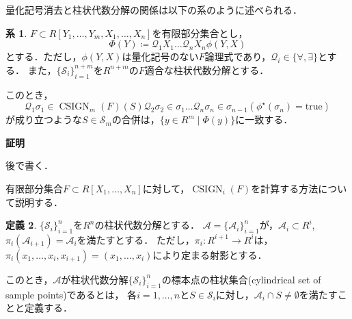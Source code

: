 \documentclass[uplatex, dvipdfmx]{jsarticle}
\makeatletter
\numberwithin{equation}{section}
\renewenvironment{proof}[1][\proofname]{\par
  \pushQED{\qed}%
  \normalfont \topsep6\p@\@plus6\p@\relax
  \trivlist
  \item\relax
  {\bfseries
  #1\@addpunct{.}}\hspace\labelsep\ignorespaces
}{
  \popQED\endtrivlist\@endpefalse
}
\newcommand{\Qua}{\mathcal{Q}}
\newcommand{\calS}{\mathcal{S}}
\newcommand{\map}[3]{{#1}\colon{#2}\rightarrow{#3}}
\newcommand{\true}{\text{true}}
\DeclareMathOperator{\CSIGN}{CSIGN}
\theoremstyle{definition}
\newtheorem{definition}{定義}[section]
\newtheorem{corollary}[definition]{系}
\renewcommand{\proofname}{\textbf{証明}}
\makeatother
\begin{document}
量化記号消去と柱状代数分解の関係は以下の系のように述べられる．
\begin{corollary}
     $F \subset R[Y_1, \dots, Y_m, X_1, \dots, X_n]$を有限部分集合とし，
     \begin{equation}
          \Phi(Y)\coloneqq \Qua_1 X_1 \dots \Qua_n X_n \phi(Y,X)
     \end{equation}
     とする．ただし，$\phi(Y,X)$は量化記号のない$F$論理式であり，$\Qua_i \in \{\forall, \exists\}$とする．
     また，$\{\calS_i\}_{i=1}^{n+m}$を$R^{n+m}$の$F$適合な柱状代数分解とする．

     このとき，
     \begin{equation}
          \Qua_1 \sigma_1 \in \CSIGN_m(F)(S) \Qua_2 \sigma_2 \in \sigma_1 \dots \Qua_n \sigma_n \in \sigma_{n-1}(\phi^\star(\sigma_n) = \true)
     \end{equation}
     が成り立つような$S \in \calS_m$の合併は，$\{y \in R^m \mid \Phi(y)\}$に一致する．
\end{corollary}

\begin{proof}
     後で書く．
\end{proof}


有限部分集合$F \subset R[X_1, \dots, X_n]$に対して，$\CSIGN_i(F)$を計算する方法について説明する．

\begin{definition}
     $\{\calS_i\}_{i=1}^n$を$R^n$の柱状代数分解とする．
     $\mathcal{A}=\{\mathcal{A}_{i}\}_{i=1}^n$が，$\mathcal{A}_i \subset R^i$, $\pi_i(\mathcal{A}_{i+1}) = \mathcal{A}_i$を満たすとする．
     ただし，$\map{\pi_i}{R^{i+1}}{R^i}$は，$\pi_i(x_1, \dots, x_i, x_{i+1}) = (x_1, \dots, x_i)$により定まる射影とする．
     
     このとき，$\mathcal{A}$が柱状代数分解$\{\calS_i\}_{i=1}^n$の標本点の柱状集合(cylindrical set of sample points)であるとは，
     各$i=1, \dots, n$と$S\in \calS_i$に対し，$\mathcal{A}_i\cap S \neq \emptyset$を満たすことと定義する．
\end{definition}
\end{document}

